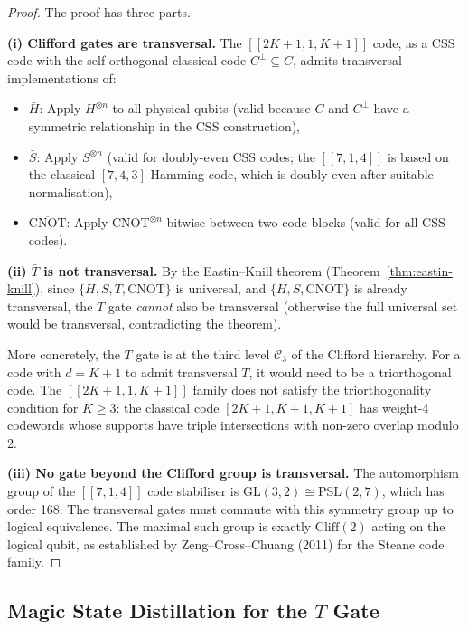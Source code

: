 \documentclass[11pt]{article}
\theoremstyle{definition}
\theoremstyle{remark}
\begin{document}
\begin{proof}
The proof has three parts.

\textbf{(i) Clifford gates are transversal.}
The $[[2K{+}1,1,K{+}1]]$ code, as a CSS code with the self-orthogonal
classical code $C^\perp \subseteq C$, admits transversal implementations of:
\begin{itemize}[nosep]
  \item $\bar{H}$: Apply $H^{\otimes n}$ to all physical qubits
    (valid because $C$ and $C^\perp$ have a symmetric relationship
    in the CSS construction),
  \item $\bar{S}$: Apply $S^{\otimes n}$ (valid for doubly-even CSS
    codes; the $[[7,1,4]]$ is based on the classical $[7,4,3]$
    Hamming code, which is doubly-even after suitable normalisation),
  \item $\overline{\mathrm{CNOT}}$: Apply $\mathrm{CNOT}^{\otimes n}$
    bitwise between two code blocks (valid for all CSS codes).
\end{itemize}

\textbf{(ii) $\bar{T}$ is not transversal.}
By the Eastin--Knill theorem (Theorem~\ref{thm:eastin-knill}), since
$\{H, S, T, \mathrm{CNOT}\}$ is universal, and $\{H, S, \mathrm{CNOT}\}$
is already transversal, the $T$ gate \emph{cannot} also be transversal
(otherwise the full universal set would be transversal, contradicting
the theorem).

More concretely, the $T$ gate is at the third level $\mathcal{C}_3$ of
the Clifford hierarchy. For a code with $d = K+1$ to admit transversal
$T$, it would need to be a triorthogonal code. The $[[2K{+}1,1,K{+}1]]$
family does not satisfy the triorthogonality condition for $K \geq 3$:
the classical code $[2K{+}1, K{+}1, K{+}1]$ has weight-4 codewords whose
supports have triple intersections with non-zero overlap modulo 2.

\textbf{(iii) No gate beyond the Clifford group is transversal.}
The automorphism group of the $[[7,1,4]]$ code stabiliser is
$\mathrm{GL}(3,2) \cong \mathrm{PSL}(2,7)$, which has order 168.
The transversal gates must commute with this symmetry group up to logical
equivalence. The maximal such group is exactly $\mathrm{Cliff}(2)$
acting on the logical qubit, as established by Zeng--Cross--Chuang (2011)
for the Steane code family.
\end{proof}

\subsection{Magic State Distillation for the $T$ Gate}
\label{sec:magic-state}
\end{document}
